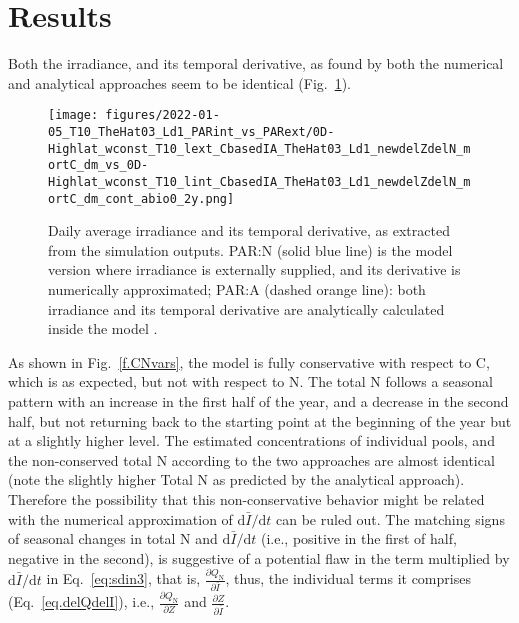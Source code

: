 \documentclass[gmd, manuscript]{copernicus}
\begin{document}




\section{Results}
Both the irradiance, and its temporal derivative, as found by both the numerical and analytical approaches seem to be identical (Fig.~\ref{f.I}).
\begin{figure}[ht!]
\texttt{[image: figures/2022-01-05\_T10\_TheHat03\_Ld1\_PARint\_vs\_PARext/0D-Highlat\_wconst\_T10\_lext\_CbasedIA\_TheHat03\_Ld1\_newdelZdelN\_mortC\_dm\_vs\_0D-Highlat\_wconst\_T10\_lint\_CbasedIA\_TheHat03\_Ld1\_newdelZdelN\_mortC\_dm\_cont\_abio0\_2y.png]}
\caption{Daily average irradiance and its temporal derivative, as extracted from the simulation outputs. PAR:N (solid blue line) is the model version where irradiance is externally supplied, and its derivative is numerically approximated; PAR:A (dashed orange line): both irradiance and its temporal derivative are analytically calculated inside the model . \label{f.I}}
\end{figure}

As shown in Fig.~\ref{f.CNvars}, the model is fully conservative with respect to C, which is as expected, but not with respect to N. The total N follows a seasonal pattern with an increase in the first half of the year, and a decrease in the second half, but not returning back to the starting point at the beginning of the year but at a slightly higher level. The estimated concentrations of individual pools, and the non-conserved total N according to the two approaches are almost identical (note the slightly higher Total N as predicted by the analytical approach). Therefore the possibility that this non-conservative behavior might be related with the numerical approximation of $\text{d}\bar{I}/\text{d}t$  can be ruled out. The matching signs of seasonal changes in total N and $\text{d}\bar{I}/\text{d}t$  (i.e., positive in the first of half, negative in the second), is suggestive of a potential flaw in the term multiplied by $\text{d}\bar{I}/\text{d}t$ in Eq.~\ref{eq:sdin3}, that is,  $\frac{\partial Q_\text{N}}{\partial \bar{I}}$, thus, the individual terms it comprises (Eq.~\ref{eq.delQdelI}), i.e., $\frac{\partial Q_\text{N}}{\partial Z}$ and $\frac{\partial Z}{\partial \bar{I}}$. 
\end{document}
